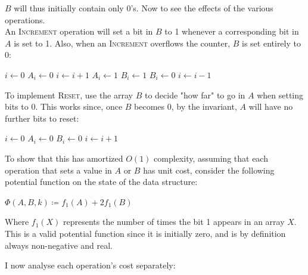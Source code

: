 \documentclass[a4paper,11pt]{scrartcl}
\begin{document}
$B$ will thus initially contain only 0's. Now to see the effects of the various operations. \\
An \textsc{Increment} operation will set a bit in $B$ to 1 whenever a corresponding bit in $A$ is set to 1. Also, when an \textsc{Increment} overflows the counter, $B$ is set entirely to $0$:

\begin{algorithmic}[1]
    \State  $i \gets 0$
        \State $A_i \gets 0$
        \State $i \gets i+1$
    \EndWhile
        \State $A_i \gets 1$
        \State $B_i \gets 1$
    \Else
            \State $B_i \gets 0$
            \State $i \gets i-1$
        \EndWhile
    \EndIf
\EndFunction
\end{algorithmic}

To implement \textsc{Reset}, use the array $B$ to decide "how far" to go in $A$ when setting bits to 0. This works since, once $B$ becomes 0, by the invariant, $A$ will have no further bits to reset:

\begin{algorithmic}[1]
    \State $i \gets 0$
        \State $A_i \gets 0$
        \State $B_i \gets 0$
        \State $i \gets i+1$
    \EndWhile
\EndFunction
\end{algorithmic}

To show that this has amortized $O(1)$ complexity, assuming that each operation that sets a value in $A$ or $B$ has unit cost, consider the following potential function on the state of the data structure:

\begin{center}
$\Phi(A, B, k) \coloneqq f_1(A) + 2 f_1(B)$
\end{center}

Where $f_1(X)$ represents the number of times the bit 1 appears in an array $X$. This is a valid potential function since it is initially zero, and is by definition always non-negative and real.

I now analyse each operation's cost separately:
\end{document}
